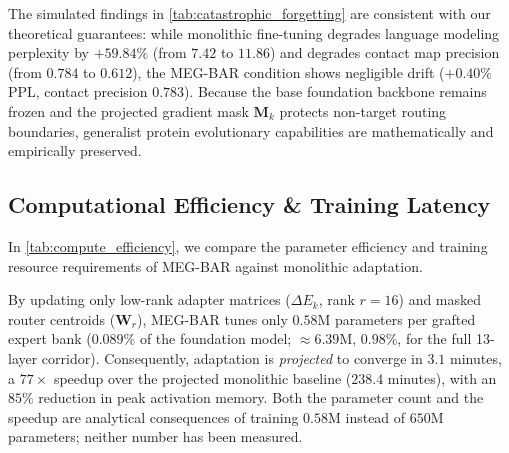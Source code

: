 \documentclass{article}
\theoremstyle{definition}
\begin{document}
The simulated findings in \cref{tab:catastrophic_forgetting} are consistent with our theoretical guarantees: while monolithic fine-tuning degrades language modeling perplexity by $+59.84\%$ (from $7.42$ to $11.86$) and degrades contact map precision (from $0.784$ to $0.612$), the MEG-BAR condition shows negligible drift ($+0.40\%$ PPL, contact precision $0.783$). Because the base foundation backbone remains frozen and the projected gradient mask $\mathbf{M}_k$ protects non-target routing boundaries, generalist protein evolutionary capabilities are mathematically and empirically preserved.

\subsection{Computational Efficiency \& Training Latency}
In \cref{tab:compute_efficiency}, we compare the parameter efficiency and training resource requirements of MEG-BAR against monolithic adaptation.

\begin{table}[t]
\centering
\small
\caption{\textbf{Computational Efficiency \& Training Resource Footprint.} Trainable parameter count, projected wall-clock time for $1,000$ steps, and relative speedup. \emph{These are analytical projections; no training run was executed on any hardware, so no wall-clock figure in this table is measured (\cref{sec:evidentiary_scope}).}}
\label{tab:compute_efficiency}
\end{table}

By updating only low-rank adapter matrices ($\Delta E_k$, rank $r = 16$) and masked router centroids ($\mathbf{W}_r$), MEG-BAR tunes only $0.58\text{M}$ parameters per grafted expert bank ($0.089\%$ of the foundation model; $\approx 6.39\text{M}$, $0.98\%$, for the full 13-layer corridor). Consequently, adaptation is \emph{projected} to converge in $3.1$ minutes, a $77\times$ speedup over the projected monolithic baseline ($238.4$ minutes), with an $85\%$ reduction in peak activation memory. Both the parameter count and the speedup are analytical consequences of training $0.58$M instead of $650$M parameters; neither number has been measured.
\end{document}

